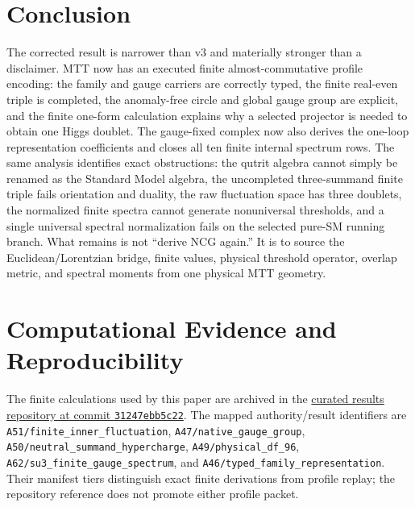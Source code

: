 \documentclass[11pt,a4paper,twoside]{article}
\theoremstyle{plain}
\theoremstyle{definition}
\theoremstyle{remark}
\begin{document}
\section{Conclusion}

The corrected result is narrower than v3 and materially stronger than a
disclaimer.  MTT now has an executed finite almost-commutative profile
encoding: the family and gauge carriers are correctly typed, the finite
real-even triple is completed, the anomaly-free circle and global gauge group
are explicit, and the finite one-form calculation explains why a selected
projector is needed to obtain one Higgs doublet.  The gauge-fixed complex now
also derives the one-loop representation coefficients and closes all ten
finite internal spectrum rows.  The same analysis identifies exact
obstructions: the qutrit algebra cannot simply be renamed as the Standard
Model algebra, the uncompleted three-summand finite triple fails orientation
and duality, the raw fluctuation space has three doublets, the normalized
finite spectra cannot generate nonuniversal thresholds, and a single
universal spectral normalization fails on the selected pure-SM running
branch.  What remains is not ``derive NCG again.''  It is to source the
Euclidean/Lorentzian bridge, finite values, physical threshold operator,
overlap metric, and spectral moments from one physical MTT geometry.

\section*{Computational Evidence and Reproducibility}
The finite calculations used by this paper are archived in the
\href{https://github.com/PeterNero/mtt-results-repro/tree/31247ebb5c22f3fbb5443024365433c6ee0bff4a}
{curated results repository at commit \texttt{31247ebb5c22}}.
The mapped authority/result identifiers are
\nolinkurl{A51/finite_inner_fluctuation},
\nolinkurl{A47/native_gauge_group},
\nolinkurl{A50/neutral_summand_hypercharge},
\nolinkurl{A49/physical_df_96},
\nolinkurl{A62/su3_finite_gauge_spectrum}, and
\nolinkurl{A46/typed_family_representation}.
Their manifest tiers distinguish exact finite derivations from profile
replay; the repository reference does not promote either profile packet.



\end{document}
